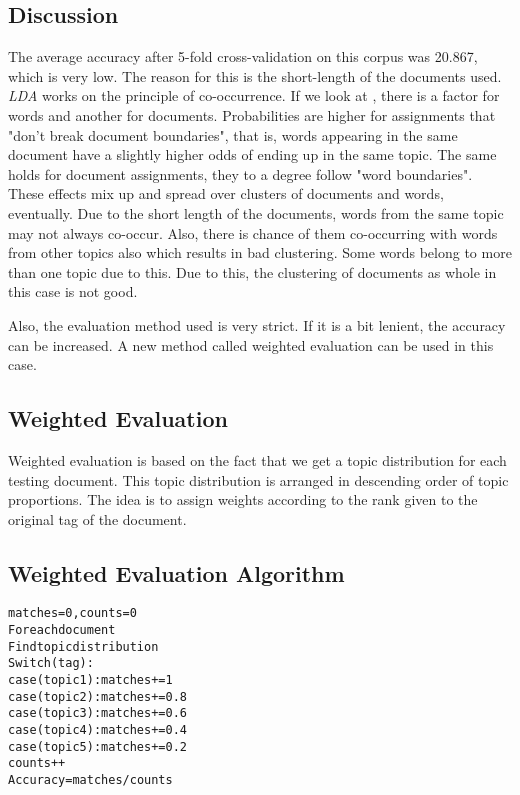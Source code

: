 \subsection*{Discussion}

\par
The average accuracy after 5-fold cross-validation on this corpus was 20.867, which is very low. The reason for this is the short-length
of the documents used. \textit{LDA} works on the principle of co-occurrence. If we look at , there is a
factor for words and another for documents. Probabilities are higher for assignments that "don't break document boundaries", that is, words 
appearing in the same document have a slightly higher odds of ending up in the same topic. The same holds for document assignments, they to 
a degree follow "word boundaries". These effects mix up and spread over clusters of documents and words, eventually. Due to the short length 
of the documents, words from the same topic may not always co-occur. Also, there is chance of them co-occurring with words from other topics 
also which results in bad clustering. Some words belong to more than one topic due to this. Due to this, the clustering of documents as whole 
in this case is not good. 

\par
Also, the evaluation method used is very strict. If it is a bit lenient, the accuracy can be increased. A new method
called weighted evaluation can be used in this case.

\subsection*{Weighted Evaluation}

Weighted evaluation is based on the fact that we get a topic distribution for each testing document. This topic distribution is arranged
in descending order of topic proportions. The idea is to assign weights according to the rank given to the original tag of the document. 

\subsection*{Weighted Evaluation Algorithm}

\begin{alltt}
matches=0, counts=0
For each document
  Find topic distribution
  Switch(tag):
    case(topic1): matches += 1
    case(topic2): matches += 0.8
    case(topic3): matches += 0.6
    case(topic4): matches += 0.4
    case(topic5): matches += 0.2
    counts++
Accuracy = matches/counts
\end{alltt}

